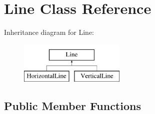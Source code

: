 \hypertarget{classLine}{\section{\-Line \-Class \-Reference}
\label{classLine}
}
\-Inheritance diagram for \-Line\-:\begin{figure}[H]
\begin{center}
\leavevmode
\includegraphics[height=2.000000cm]{classLine}
\end{center}
\end{figure}
\subsection*{\-Public \-Member \-Functions}
